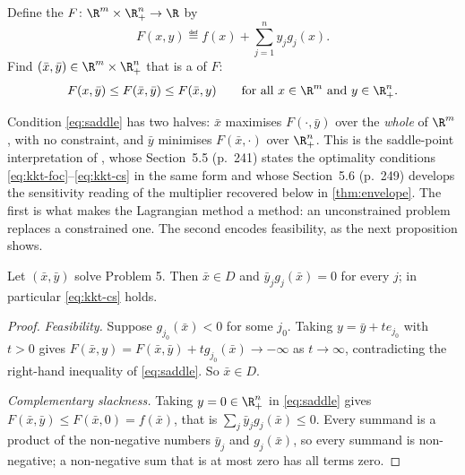 \begin{definition}\label{def:problem-5}
	Define the  $F\colon\R^m\times\R^n_+\to\R$ by
	\begin{equation}\label{eq:lagrangian}
		F(x,y)\eqdef f(x)+\sum_{j=1}^{n}y_jg_j(x).
	\end{equation}
	Find $(\bar x,\bar y)\in\R^m\times\R^n_+$ that is a  of $F$:
	\begin{equation}\label{eq:saddle}
		F(x,\bar y)\leq F(\bar x,\bar y)\leq F(\bar x,y)
		\qquad\text{for all }x\in\R^m\text{ and }y\in\R^n_+ .
	\end{equation}
\end{definition}

Condition \eqref{eq:saddle} has two halves: $\bar x$ maximises $F(\cdot,\bar y)$
over the \emph{whole} of $\R^m$, with no constraint, and $\bar y$ minimises
$F(\bar x,\cdot)$ over $\R^n_+$. This is the saddle-point interpretation of
\textcite[Sec.~5.4, p.~237]{boyd2004convex}, whose Section~5.5 (p.~241) states
the optimality conditions \eqref{eq:kkt-foc}--\eqref{eq:kkt-cs} in the same
form and whose Section~5.6 (p.~249) develops the sensitivity reading of the
multiplier recovered below in \autoref{thm:envelope}. The first is what makes the Lagrangian method a
method: an unconstrained problem replaces a constrained one. The second encodes
feasibility, as the next proposition shows.

\begin{proposition}\label{prop:cs}
	Let $(\bar x,\bar y)$ solve Problem 5. Then $\bar x\in D$ and
	$\bar y_jg_j(\bar x)=0$ for every $j$; in particular \eqref{eq:kkt-cs} holds.
\end{proposition}

\begin{proof}
	\emph{Feasibility.} Suppose $g_{j_0}(\bar x)<0$ for some $j_0$. Taking
	$y=\bar y+te_{j_0}$ with $t>0$ gives
	$F(\bar x,y)=F(\bar x,\bar y)+tg_{j_0}(\bar x)\to-\infty$ as $t\to\infty$,
	contradicting the right-hand inequality of \eqref{eq:saddle}. So
	$\bar x\in D$.

	\emph{Complementary slackness.} Taking $y=0\in\R^n_+$ in \eqref{eq:saddle} gives
	$F(\bar x,\bar y)\leq F(\bar x,0)=f(\bar x)$, that is
	$\sum_j\bar y_jg_j(\bar x)\leq0$. Every summand is a product of the
	non-negative numbers $\bar y_j$ and $g_j(\bar x)$, so every summand is
	non-negative; a non-negative sum that is at most zero has all terms zero.
\end{proof}

